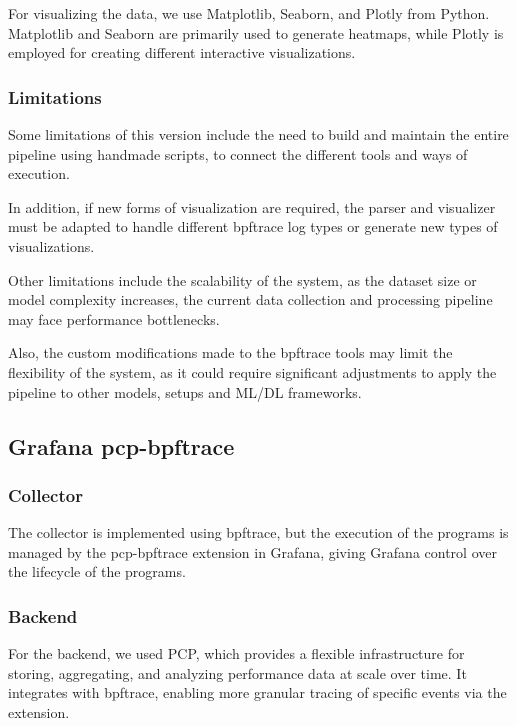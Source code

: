 \documentclass[conference]{IEEEtran}
\begin{document}
For visualizing the data, we use Matplotlib, Seaborn, and Plotly from Python.
Matplotlib and Seaborn are primarily used to generate heatmaps, while Plotly is employed for creating different interactive visualizations.

\subsubsection{Limitations}

Some limitations of this version include the need to build and maintain the entire pipeline using handmade scripts, to connect the different tools and ways of execution.

In addition, if new forms of visualization are required, the parser and visualizer must be adapted to handle different bpftrace log types or generate new types of visualizations.

Other limitations include the scalability of the system, as the dataset size or model complexity increases, the current data collection and processing pipeline may face performance bottlenecks.

Also, the custom modifications made to the bpftrace tools may limit the flexibility of the system, as it could require significant adjustments to apply the pipeline to other models, setups and ML/DL frameworks.

\subsection{Grafana pcp-bpftrace}

\subsubsection{Collector}

The collector is implemented using bpftrace, but the execution of the programs is managed by the pcp-bpftrace extension in Grafana, giving Grafana control over the lifecycle of the programs.

\subsubsection{Backend}

For the backend, we used PCP, which provides a flexible infrastructure for storing, aggregating, and analyzing performance data at scale over time.
It integrates with bpftrace, enabling more granular tracing of specific events via the extension.
\end{document}
